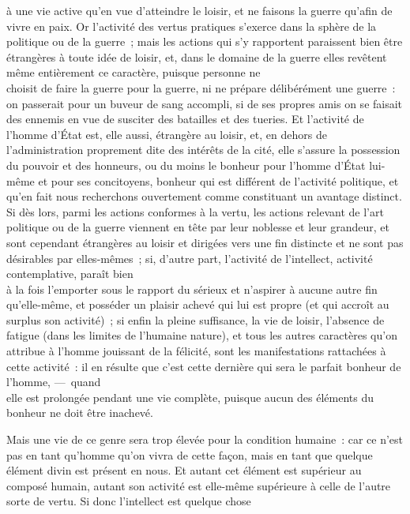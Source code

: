 \documentclass[french,twoside]{book} %
\begin{document}
à une vie active qu’en vue d’atteindre le loisir, et ne faisons la guerre qu’afin de vivre en paix. Or l’activité des vertus pratiques s’exerce dans la sphère de la politique ou de la guerre ; mais les actions qui s’y rapportent paraissent bien être étrangères à toute idée de loisir, et, dans le domaine de la guerre elles revêtent même entièrement ce caractère, puisque personne ne \\
choisit de faire la guerre pour la guerre, ni ne prépare délibérément une guerre : on passerait pour un buveur de sang accompli, si de ses propres amis on se faisait des ennemis en vue de susciter des batailles et des tueries. Et l’activité de l’homme d’État est, elle aussi, étrangère au loisir, et, en dehors de l’administration proprement dite des intérêts de la cité, elle s’assure la possession du pouvoir et des honneurs, ou du moins le bonheur pour l’homme d’État lui-même et pour ses concitoyens, bonheur qui est différent de l’activité politique, et \\
qu’en fait nous recherchons ouvertement comme constituant un avantage distinct. Si dès lors, parmi les actions conformes à la vertu, les actions relevant de l’art politique ou de la guerre viennent en tête par leur noblesse et leur grandeur, et sont cependant étrangères au loisir et dirigées vers une fin distincte et ne sont pas désirables par elles-mêmes ; si, d’autre part, l’activité de l’intellect, activité contemplative, paraît bien \\
à la fois l’emporter sous le rapport du sérieux et n’aspirer à aucune autre fin qu’elle-même, et posséder un plaisir achevé qui lui est propre (et qui accroît au surplus son activité) ; si enfin la pleine suffisance, la vie de loisir, l’absence de fatigue (dans les limites de l’humaine nature), et tous les autres caractères qu’on attribue à l’homme jouissant de la félicité, sont les manifestations rattachées à cette activité : il en résulte que c’est cette dernière qui sera le parfait bonheur de l’homme, — quand \\
elle est prolongée pendant une vie complète, puisque aucun des éléments du bonheur ne doit être inachevé.\par
Mais une vie de ce genre sera trop élevée pour la condition humaine : car ce n’est pas en tant qu’homme qu’on vivra de cette façon, mais en tant que quelque élément divin est présent en nous. Et autant cet élément est supérieur au composé humain, autant son activité est elle-même supérieure à celle de l’autre sorte de vertu. Si donc l’intellect est quelque chose \\
\end{document}
